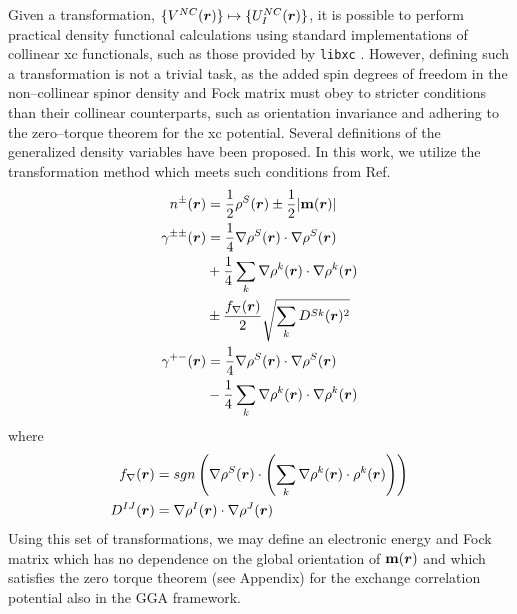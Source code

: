 Given a transformation, $\{ V^{NC}(\boldsymbol{r}) \} \mapsto \{U^{NC}_I(\boldsymbol{r})\}$, it is possible to perform practical
density functional calculations using standard implementations of collinear xc functionals, such
as those provided by \texttt{libxc} \cite{Burnus12_2272,Marques18_1}. However, defining such a transformation is not 
a trivial task, as the added spin degrees of freedom in the non--collinear spinor density and
Fock matrix must obey to stricter conditions than their collinear counterparts, such as orientation
invariance and adhering to the zero--torque theorem for the xc potential.\cite{Gyorffy01_206403}
Several definitions of the generalized density variables have been proposed.\cite{Wullen02_779,Ullrich05_073102,Frisch07_125119,Frisch12_2193,Scuseria13_035117}
In this work, we utilize the transformation method which meets such conditions from Ref.\cite{Li17_2591} 
\begin{subequations}
  \label{eq:NCtrans}
  \begin{align}    
    n^\pm(\boldsymbol{r})        & = \frac{1}{2}\rho^S(\boldsymbol{r}) \pm \frac{1}{2} \vert\mathbf{m}(\boldsymbol{r})\vert\\
    \gamma^{\pm\pm}(\boldsymbol{r}) & = \frac{1}{4}\nabla\rho^S (\boldsymbol{r})\cdot \nabla\rho^S (\boldsymbol{r}) \\  
                         & + \frac{1}{4}\sum_k \nabla\rho^k (\boldsymbol{r}) \cdot \nabla\rho^k (\boldsymbol{r}) \nonumber \\
                         & \pm \frac{f_{\nabla}(\boldsymbol{r})}{2}\sqrt{ \sum_k D^{Sk} (\boldsymbol{r})^2} \nonumber \\
    \gamma^{+-}(\boldsymbol{r})      & = \frac{1}{4}\nabla\rho^S (\boldsymbol{r})\cdot \nabla\rho^S (\boldsymbol{r}) \\ 
                         & - \frac{1}{4}\sum_k \nabla\rho^k (\boldsymbol{r}) \cdot \nabla\rho^k (\boldsymbol{r}) \nonumber
  \end{align}
\end{subequations}
where
\begin{align}  
  f_{\nabla}(\boldsymbol{r}) & = sgn\left(\nabla\rho^S (\boldsymbol{r}) \cdot \left(\sum_k \nabla\rho^k (\boldsymbol{r}) \cdot \rho^k (\boldsymbol{r}) \right)\right) \\
  D^{IJ} (\boldsymbol{r})      &  = \nabla\rho^I (\boldsymbol{r}) \cdot  \nabla \rho^J (\boldsymbol{r})  
\end{align} 
Using this set of transformations, we may define an electronic energy and Fock matrix which has no dependence
on the global orientation of $\mathbf{m}(\boldsymbol{r})$ and which satisfies the zero torque theorem (see Appendix) for
the exchange correlation potential also in the GGA framework.

